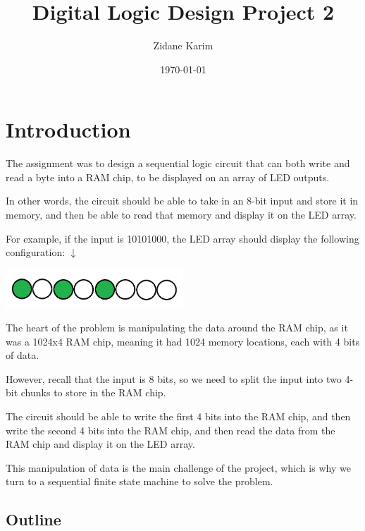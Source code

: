 \documentclass{article}
\title{Digital Logic Design Project 2} %
\author{Zidane Karim} %
\date{\today} %
\begin{document}
    \maketitle %
    
    \section{Introduction} %
    
        
    The assignment was to design a sequential logic circuit that can both write and read a byte into a RAM chip, to be displayed on an array of LED outputs. 
    
    In other words, the circuit should be able to take in an 8-bit input and store it in memory, and then be able to read that memory and display it on the LED array.
    
    For example, if the input is 10101000, the LED array should display the following configuration: $\downarrow$

    \begin{center}
        \includegraphics[width=0.5\textwidth]{LED_Output_Paint.png}
    \end{center}

    The heart of the problem is manipulating the data around the RAM chip, as it was a 1024x4 RAM chip, meaning it had 1024 memory locations, each with 4 bits of data.
    
    However, recall that the input is 8 bits, so we need to split the input into two 4-bit chunks to store in the RAM chip.
    
    The circuit should be able to write the first 4 bits into the RAM chip, and then write the second 4 bits into the RAM chip, and then read the data from the RAM chip and display it on the LED array.
    
    This manipulation of data is the main challenge of the project, which is why we turn to a sequential finite state machine to solve the problem.

    \subsection{Outline}
\end{document}
